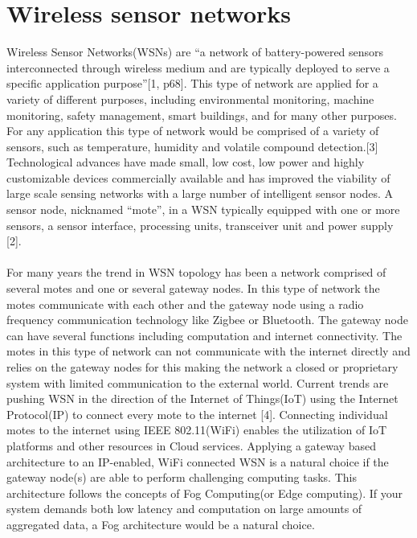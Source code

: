 \documentclass[]{uiophd}
\begin{document}
\section{Wireless sensor networks}
Wireless Sensor Networks(WSNs) are “a network of battery-powered sensors interconnected through wireless medium and are typically deployed to serve a specific application purpose”[1, p68]. This type of network are applied for a variety of different purposes, including environmental monitoring, machine monitoring, safety management, smart buildings, and for many other purposes. For any application this type of network would be comprised of a variety of sensors, such as temperature, humidity and volatile compound detection.[3] Technological advances have made small, low cost, low power and highly customizable devices commercially available and has improved the viability of large scale sensing networks with a large number of intelligent sensor nodes. A sensor node, nicknamed “mote”, in a WSN typically equipped with one or more sensors, a sensor interface, processing units, transceiver unit and power supply [2]. 
\\\\
For many years the trend in WSN topology has been a network comprised of several motes and one or several gateway nodes. In this type of network the motes communicate with each other and the gateway node using a radio frequency communication technology like Zigbee or Bluetooth. The gateway node can have several functions including computation and internet connectivity. The motes in this type of network can not communicate with the internet directly and relies on the gateway nodes for this making the network a closed or proprietary system with limited communication to the external world. Current trends are pushing WSN in the direction of the Internet of Things(IoT) using the Internet Protocol(IP) to connect every mote to the internet [4]. Connecting individual motes to the internet using  IEEE 802.11(WiFi) enables the utilization of IoT platforms and other resources in Cloud services. Applying a gateway based architecture to an IP-enabled, WiFi connected WSN is a natural choice if the gateway node(s) are able to perform challenging computing tasks. This architecture follows the concepts of Fog Computing(or Edge computing). If your system demands both low latency and computation on large amounts of aggregated data, a Fog architecture would be a natural choice. 
\\\\
\end{document}
